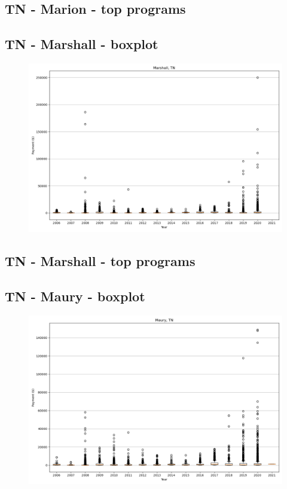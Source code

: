 \subsection*{TN - Marion - top programs}

\newpage
\subsection*{TN - Marshall - boxplot}
\begin{figure}[h]
\centering
\includegraphics[width=7in]{../output/boxplots/counties/Marshall-TN_boxplot.png}
\end{figure}


\subsection*{TN - Marshall - top programs}

\newpage
\subsection*{TN - Maury - boxplot}
\begin{figure}[h]
\centering
\includegraphics[width=7in]{../output/boxplots/counties/Maury-TN_boxplot.png}
\end{figure}


